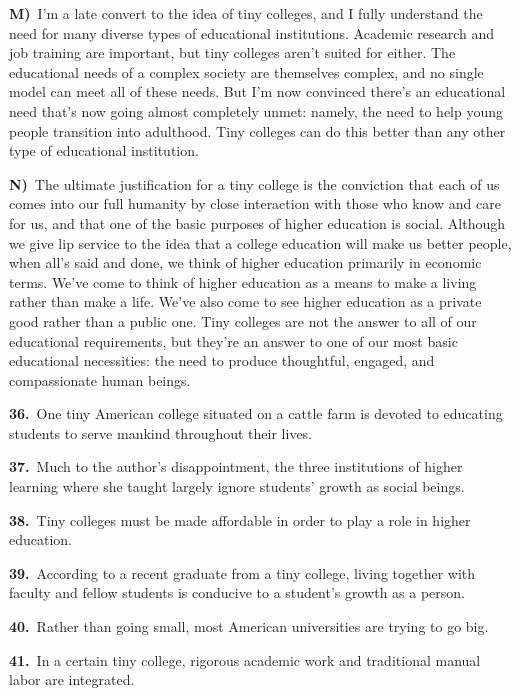 \noindent\textbf{M)}\ I'm a late convert to the idea of tiny colleges, and I fully understand the need for many diverse types of educational institutions. Academic research and job training are important, but tiny colleges aren't suited for either. The educational needs of a complex society are themselves complex, and no single model can meet all of these needs. But I'm now convinced there's an educational need that's now going almost completely unmet: namely, the need to help young people transition into adulthood. Tiny colleges can do this better than any other type of educational institution.\par
\smallskip
\noindent\textbf{N)}\ The ultimate justification for a tiny college is the conviction that each of us comes into our full humanity by close interaction with those who know and care for us, and that one of the basic purposes of higher education is social. Although we give lip service to the idea that a college education will make us better people, when all's said and done, we think of higher education primarily in economic terms. We've come to think of higher education as a means to make a living rather than make a life. We've also come to see higher education as a private good rather than a public one. Tiny colleges are not the answer to all of our educational requirements, but they're an answer to one of our most basic educational necessities: the need to produce thoughtful, engaged, and compassionate human beings.\par
\smallskip
\medskip
\noindent\textbf{36.}\ One tiny American college situated on a cattle farm is devoted to educating students to serve mankind throughout their lives.\par
\smallskip
\noindent\textbf{37.}\ Much to the author's disappointment, the three institutions of higher learning where she taught largely ignore students' growth as social beings.\par
\smallskip
\noindent\textbf{38.}\ Tiny colleges must be made affordable in order to play a role in higher education.\par
\smallskip
\noindent\textbf{39.}\ According to a recent graduate from a tiny college, living together with faculty and fellow students is conducive to a student's growth as a person.\par
\smallskip
\noindent\textbf{40.}\ Rather than going small, most American universities are trying to go big.\par
\smallskip
\noindent\textbf{41.}\ In a certain tiny college, rigorous academic work and traditional manual labor are integrated.\par
